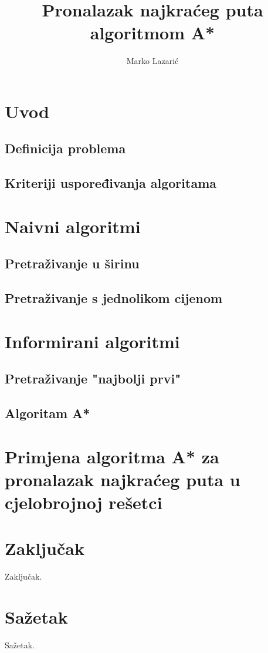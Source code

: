 \documentclass[times, utf8, seminar, numeric]{fer}
\begin{document}
\nocite{*}

\title{Pronalazak najkraćeg puta algoritmom A*}

\author{Marko Lazarić}


\maketitle

\tableofcontents

\chapter{Uvod}

\section{Definicija problema}

\section{Kriteriji uspoređivanja algoritama}


\chapter{Naivni algoritmi}


\section{Pretraživanje u širinu}


\section{Pretraživanje s jednolikom cijenom}


\chapter{Informirani algoritmi}

\section{Pretraživanje "najbolji prvi"}

\section{Algoritam A*}


\chapter{Primjena algoritma A* za pronalazak najkraćeg puta u cjelobrojnoj rešetci}

\chapter{Zaključak}
Zaključak.




\chapter{Sažetak}
Sažetak.
\end{document}

